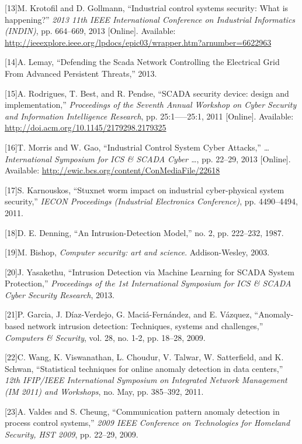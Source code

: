 \documentclass[11pt,]{article}
\begin{document}
{[}13{]}M. Krotofil and D. Gollmann, ``Industrial control systems
security: What is happening?'' \emph{2013 11th IEEE International
Conference on Industrial Informatics (INDIN)}, pp. 664--669, 2013
{[}Online{]}. Available:
\url{http://ieeexplore.ieee.org/lpdocs/epic03/wrapper.htm?arnumber=6622963}

{[}14{]}A. Lemay, ``Defending the Scada Network Controlling the
Electrical Grid From Advanced Persistent Threats,'' 2013.

{[}15{]}A. Rodrigues, T. Best, and R. Pendse, ``SCADA security device:
design and implementation,'' \emph{Proceedings of the Seventh Annual
Workshop on Cyber Security and Information Intelligence Research}, pp.
25:1-----25:1, 2011 {[}Online{]}. Available:
\url{http://doi.acm.org/10.1145/2179298.2179325}

{[}16{]}T. Morris and W. Gao, ``Industrial Control System Cyber
Attacks,'' \emph{\ldots{}International Symposium for ICS \& SCADA Cyber
\ldots{}}, pp. 22--29, 2013 {[}Online{]}. Available:
\url{http://ewic.bcs.org/content/ConMediaFile/22618}

{[}17{]}S. Karnouskos, ``Stuxnet worm impact on industrial
cyber-physical system security,'' \emph{IECON Proceedings (Industrial
Electronics Conference)}, pp. 4490--4494, 2011.

{[}18{]}D. E. Denning, ``An Intrusion-Detection Model,'' no. 2, pp.
222--232, 1987.

{[}19{]}M. Bishop, \emph{Computer security: art and science}.
Addison-Wesley, 2003.

{[}20{]}J. Yasakethu, ``Intrusion Detection via Machine Learning for
SCADA System Protection,'' \emph{Proceedings of the 1st International
Symposium for ICS \& SCADA Cyber Security Research}, 2013.

{[}21{]}P. Garcia, J. Díaz-Verdejo, G. Maciá-Fernández, and E. Vázquez,
``Anomaly-based network intrusion detection: Techniques, systems and
challenges,'' \emph{Computers \& Security}, vol. 28, no. 1-2, pp.
18--28, 2009.

{[}22{]}C. Wang, K. Viswanathan, L. Choudur, V. Talwar, W. Satterfield,
and K. Schwan, ``Statistical techniques for online anomaly detection in
data centers,'' \emph{12th IFIP/IEEE International Symposium on
Integrated Network Management (IM 2011) and Workshops}, no. May, pp.
385--392, 2011.

{[}23{]}A. Valdes and S. Cheung, ``Communication pattern anomaly
detection in process control systems,'' \emph{2009 IEEE Conference on
Technologies for Homeland Security, HST 2009}, pp. 22--29, 2009.
\end{document}
